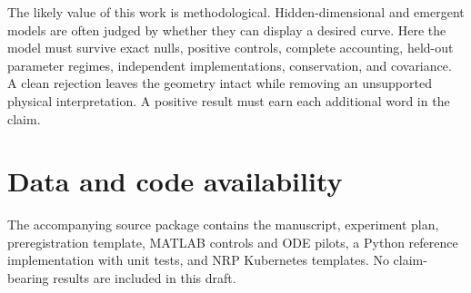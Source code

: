 \documentclass[aps,prd,reprint,nofootinbib,longbibliography]{revtex4-2}
\begin{document}
The likely value of this work is methodological.  Hidden-dimensional and emergent
models are often judged by whether they can display a desired curve.  Here the
model must survive exact nulls, positive controls, complete accounting, held-out
parameter regimes, independent implementations, conservation, and covariance.  A
clean rejection leaves the geometry intact while removing an unsupported physical
interpretation.  A positive result must earn each additional word in the claim.

\section*{Data and code availability}

The accompanying source package contains the manuscript, experiment plan,
preregistration template, MATLAB controls and ODE pilots, a Python reference
implementation with unit tests, and NRP Kubernetes templates.  No claim-bearing
results are included in this draft.


\end{document}
